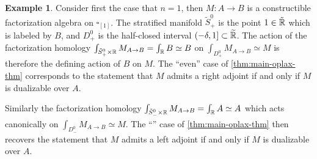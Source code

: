 \documentclass[10pt, reqno, twoside
, final
]{amsart}
\numberwithin{equation}{subsection}%
\theoremstyle{definition}
\theoremstyle{definition}
\theoremstyle{definition}
\theoremstyle{definition}
\theoremstyle{definition}
\theoremstyle{definition}
\theoremstyle{definition}
\theoremstyle{definition}
\theoremstyle{definition}
\theoremstyle{plain}
\theoremstyle{definition}
\theoremstyle{plain}
\theoremstyle{definition}
\theoremstyle{plain}
\theoremstyle{definition}
\theoremstyle{definition}
\theoremstyle{plain}
\theoremstyle{plain}
\theoremstyle{definition}
\newtheorem{ex}[defn]{Example}
\theoremstyle{plain}
\theoremstyle{plain}
\theoremstyle{plain}
\begin{document}
\begin{ex}
Consider first the case that $n=1$, then $M:A\to B$ is a constructible factorization algebra on $\square_{[1]}$. The stratified manifold $\tilde{S}^{0}_+$ is the point $1\in \tilde{\mathbb{R}}$ which is labeled by $B$, and ${D}^{0}_+$ is the half-closed interval $(-\delta,1] \subset \widetilde{\mathbb{R}}$. The action of the factorization homology $\int_{\tilde{S}^{0}_+ \times \mathbb{R}} M_{A\to B} = \int_{\mathbb{R}} B \simeq B$ on $\int_{D^{0}_+} M_{A\to B} \simeq M$ is therefore the defining action of $B$ on $M$. The ``even'' case of \cref{thm:main-oplax-thm} corresponds to the statement that $M$ admits a right adjoint if and only if $M$ is dualizable over $A$.

Similarly the factorization homology $\int_{\tilde{S}^{0}_- \times \mathbb{R}} M_{A\to B} = \int_{\mathbb{R}} A \simeq A$ which acts canonically on $\int_{D^{0}_-} M_{A\to B} \simeq M$. The ``'' case of \cref{thm:main-oplax-thm} then recovers the statement that $M$ admits a left adjoint if and only if $M$ is dualizable over $A$.
\end{ex}
\end{document}

